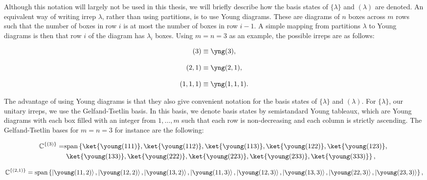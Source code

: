 Although this notation will largely not be used in this thesis, we will briefly describe how the basis states of $\{\lambda\}$ and $(\lambda)$ are denoted. An equivalent way of writing irrep $\lambda$, rather than using partitions, is to use Young diagrams. These are diagrams of $n$ boxes across $m$ rows such that the number of boxes in row $i$ is at most the number of boxes in row $i-1$. A simple mapping from partitions $\lambda$ to Young diagrams is then that row $i$ of the diagram has $\lambda_i$ boxes. Using $m=n=3$ as an example, the possible irreps are as follows:

\begin{equation}
(3) \equiv \yng(3),
\end{equation}

\begin{equation}
(2,1) \equiv \yng(2,1),
\end{equation}

\begin{equation}
(1,1,1) \equiv \yng(1,1,1).
\end{equation}

The advantage of using Young diagrams is that they also give convenient notation for the basis states of $\{\lambda\}$ and $(\lambda)$. For $\{\lambda\}$, our unitary irreps, we use the Gelfand-Tsetlin basis. In this basis, we denote basis states by semistandard Young tableaux, which are Young diagrams with each box filled with an integer from $1,\dots,m$ such that each row is non-decreasing and each column is strictly ascending. The Gelfand-Tsetlin bases for $m=n=3$ for instance are the following:

\begin{align}
\mathbb{C}^{\{(3)\}} = &\textrm{span}\left\{\ket{\young(111)}, \ket{\young(112)}, \ket{\young(113)}, \ket{\young(122)}, \ket{\young(123)},\right.\\ 
&\left.\ket{\young(133)}, \ket{\young(222)}, \ket{\young(223)}, \ket{\young(233)}, \ket{\young(333)}\right\},
\end{align}

\begin{equation}
\mathbb{C}^{\{(2,1)\}} = \textrm{span}\left\{\left|\young(11,2)\right\rangle, \left|\young(12,2)\right\rangle, \left|\young(13,2)\right\rangle, \left|\young(11,3)\right\rangle, \left|\young(12,3)\right\rangle, \left|\young(13,3)\right\rangle, \left|\young(22,3)\right\rangle, \left|\young(23,3)\right\rangle\right\},
\end{equation}

